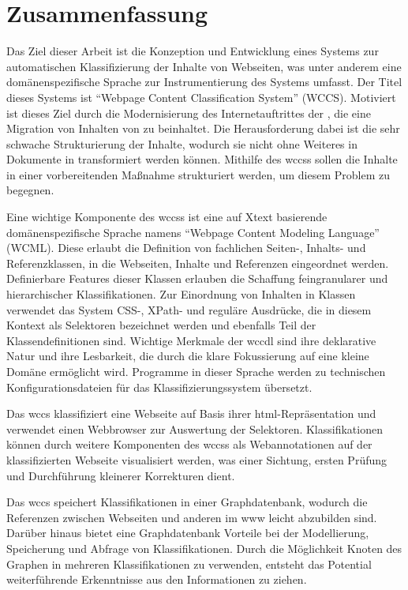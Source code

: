 \section{Zusammenfassung}
    Das Ziel dieser Arbeit ist die Konzeption und Entwicklung
    eines Systems zur automatischen Klassifizierung der Inhalte
    von Webseiten, was unter anderem eine domänenspezifische
    Sprache zur Instrumentierung des Systems umfasst.
    Der Titel dieses Systems ist
    "`Webpage Content Classification System"' (WCCS).
    Motiviert ist dieses Ziel durch die Modernisierung des
    Internetauftrittes der {\fernUni},
    die eine Migration von Inhalten von {\wordpress} zu
    {\imperia} beinhaltet.
    Die Herausforderung dabei ist die sehr schwache Strukturierung
    der Inhalte, wodurch sie nicht ohne Weiteres in
    Dokumente in {\imperia} transformiert werden können.
    Mithilfe des \glspl{wccs} sollen die Inhalte in einer vorbereitenden
    Maßnahme strukturiert werden, um diesem Problem zu begegnen.

    Eine wichtige Komponente des \glspl{wccs} ist eine auf Xtext basierende
    domänenspezifische Sprache namens "`Webpage Content Modeling Language"' (WCML).
    Diese erlaubt die Definition von fachlichen Seiten-, Inhalts- und
    Referenzklassen, in die Webseiten, Inhalte und Referenzen eingeordnet werden.
    Definierbare Features dieser Klassen erlauben die Schaffung feingranularer
    und hierarchischer Klassifikationen.
    Zur Einordnung von Inhalten in Klassen verwendet das System
    CSS-, XPath- und reguläre Ausdrücke, die in diesem Kontext als
    Selektoren bezeichnet werden und
    ebenfalls Teil der Klassendefinitionen sind.
    Wichtige Merkmale der \gls{wccdl} sind ihre deklarative Natur
    und ihre Lesbarkeit,
    die durch die klare Fokussierung auf eine kleine Domäne ermöglicht wird.
    Programme in dieser Sprache werden zu technischen
    Konfigurationsdateien für das Klassifizierungssystem übersetzt.

    Das \gls{wccs} klassifiziert eine Webseite auf Basis ihrer
    \gls{html}-Repräsentation und verwendet einen Webbrowser zur Auswertung der Selektoren.
    Klassifikationen können durch weitere Komponenten des \glspl{wccs}
    als Webannotationen auf der klassifizierten Webseite visualisiert werden,
    was einer Sichtung, ersten Prüfung und Durchführung kleinerer
    Korrekturen dient.

    Das \gls{wccs} speichert Klassifikationen in einer Graphdatenbank,
    wodurch die Referenzen zwischen Webseiten und anderen {\resources}
    im \gls{www} leicht abzubilden sind.
    Darüber hinaus bietet eine Graphdatenbank Vorteile bei der Modellierung,
    Speicherung und Abfrage von Klassifikationen.
    Durch die Möglichkeit Knoten des Graphen in mehreren Klassifikationen
    zu verwenden, entsteht das Potential weiterführende Erkenntnisse
    aus den Informationen zu ziehen.

